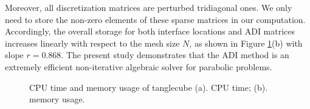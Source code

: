 \documentclass[dissertation]{uathesis}
\begin{document}
\begin{body}
\begin{flushleft}
\hspace{1cm} Moreover, all discretization matrices are perturbed tridiagonal ones. We only need to store the non-zero elements of these sparse matrices in our computation. 
Accordingly, the overall storage for both interface locations and ADI matrices increases linearly
with respect to the mesh size $N$, as shown in Figure \ref{fig:CPU_Memory_tanglecube}(b) with slope $r=0.868$. 
The present study demonstrates that the ADI method is an extremely efficient non-iterative algebraic solver for parabolic problems.

\begin{figure}[!ht]	
	\begin{center}
	\end{center}
	\caption{CPU time and memory usage of tanglecube (a). CPU time; (b). memory usage.}
	\label{fig:CPU_Memory_tanglecube}
\end{figure}



\end{flushleft}
\end{body}
\end{document}
